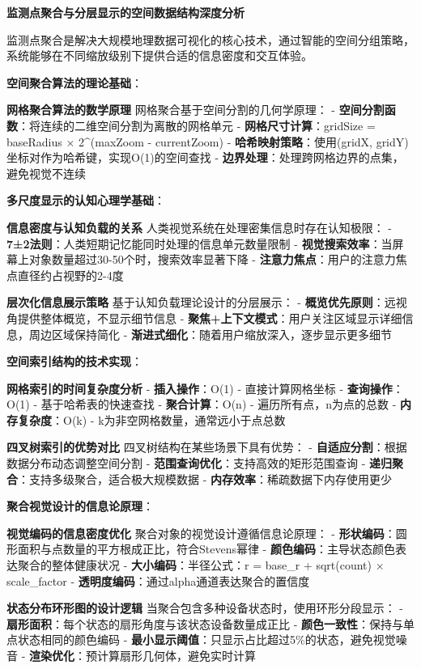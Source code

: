 \textbf{监测点聚合与分层显示的空间数据结构深度分析}

监测点聚合是解决大规模地理数据可视化的核心技术，通过智能的空间分组策略，系统能够在不同缩放级别下提供合适的信息密度和交互体验。

\textbf{空间聚合算法的理论基础}：

\textbf{网格聚合算法的数学原理} 网格聚合基于空间分割的几何学原理： - \textbf{空间分割函数}：将连续的二维空间分割为离散的网格单元 - \textbf{网格尺寸计算}：gridSize = baseRadius × 2\^{}(maxZoom - currentZoom) - \textbf{哈希映射策略}：使用(gridX, gridY)坐标对作为哈希键，实现O(1)的空间查找 - \textbf{边界处理}：处理跨网格边界的点集，避免视觉不连续

\textbf{多尺度显示的认知心理学基础}：

\textbf{信息密度与认知负载的关系} 人类视觉系统在处理密集信息时存在认知极限： - \textbf{7±2法则}：人类短期记忆能同时处理的信息单元数量限制 - \textbf{视觉搜索效率}：当屏幕上对象数量超过30-50个时，搜索效率显著下降 - \textbf{注意力焦点}：用户的注意力焦点直径约占视野的2-4度

\textbf{层次化信息展示策略} 基于认知负载理论设计的分层展示： - \textbf{概览优先原则}：远视角提供整体概览，不显示细节信息 - \textbf{聚焦+上下文模式}：用户关注区域显示详细信息，周边区域保持简化 - \textbf{渐进式细化}：随着用户缩放深入，逐步显示更多细节

\textbf{空间索引结构的技术实现}：

\textbf{网格索引的时间复杂度分析} - \textbf{插入操作}：O(1) - 直接计算网格坐标 - \textbf{查询操作}：O(1) - 基于哈希表的快速查找 - \textbf{聚合计算}：O(n) - 遍历所有点，n为点的总数 - \textbf{内存复杂度}：O(k) - k为非空网格数量，通常远小于点总数

\textbf{四叉树索引的优势对比} 四叉树结构在某些场景下具有优势： - \textbf{自适应分割}：根据数据分布动态调整空间分割 - \textbf{范围查询优化}：支持高效的矩形范围查询 - \textbf{递归聚合}：支持多级聚合，适合极大规模数据 - \textbf{内存效率}：稀疏数据下内存使用更少

\textbf{聚合视觉设计的信息论原理}：

\textbf{视觉编码的信息密度优化} 聚合对象的视觉设计遵循信息论原理： - \textbf{形状编码}：圆形面积与点数量的平方根成正比，符合Stevens幂律 - \textbf{颜色编码}：主导状态颜色表达聚合的整体健康状况 - \textbf{大小编码}：半径公式：r = base\_r + sqrt(count) × scale\_factor - \textbf{透明度编码}：通过alpha通道表达聚合的置信度

\textbf{状态分布环形图的设计逻辑} 当聚合包含多种设备状态时，使用环形分段显示： - \textbf{扇形面积}：每个状态的扇形角度与该状态设备数量成正比 - \textbf{颜色一致性}：保持与单点状态相同的颜色编码 - \textbf{最小显示阈值}：只显示占比超过5\%的状态，避免视觉噪音 - \textbf{渲染优化}：预计算扇形几何体，避免实时计算


